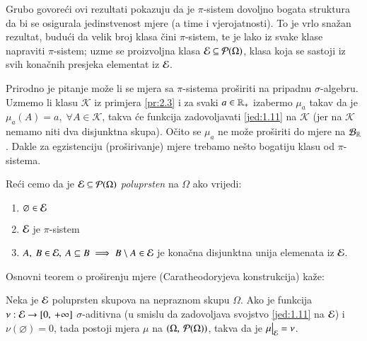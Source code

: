 \begin{nap} \label{nap:2.10}
    Grubo govore\' ci ovi rezultati pokazuju da je $\pi$-sistem
    dovoljno bogata struktura da bi se osigurala jedinstvenost mjere
    (a time i vjerojatnosti). To je vrlo sna\v zan rezultat,
    budu\' ci da velik broj klasa \v cini $\pi$-sistem, te je lako iz
    svake klase napraviti $\pi$-sistem; uzme se proizvoljna klasa
    $\mathcal{E} \subseteq \mathcal{P}({\Omega})$, klasa koja se sastoji iz svih
    kona\v cnih presjeka elementat iz $\mathcal{E}$.

    Prirodno je pitanje mo\v ze li se mjera sa $\pi$-sistema
    pro\v siriti na pripadnu $\sigma$-algebru. Uzmemo li klasu
    $\mathcal{K}$ iz primjera \ref{pr:2.3} i za svaki $a \in \mathbb{R}_+$
    izabermo $\mu_a$ takav da je $\mu_a(A) = a, \; \forall A \in
    \mathcal{K}$, takva \' ce funkcija zadovoljavati
    \eqref{jed:1.11} na $\mathcal{K}$ (jer na $\mathcal{K}$ nemamo
    niti dva disjunktna skupa). O\v cito se $\mu_a$ ne mo\v ze
    pro\v siriti do mjere na $\mathcal{B}_{\mathbb{R}}$.
    Dakle za egzistenciju  (pro\v sirivanje) mjere trebamo ne\v sto
    bogatiju klasu od $\pi$-sistema.
\end{nap}

Re\' ci cemo da je $\mathcal{E} \subseteq \mathcal{P}({\Omega})$ \emph{poluprsten}
na $\Omega$ ako vrijedi:
\begin{enumerate}[label=(\roman*)]
    \item $\varnothing \in \mathcal{E}$
    \item $\mathcal{E}$ je $\pi$-sistem
    \item $A, \: B \in \mathcal{E}, \: A \subseteq B \implies B \setminus
        A \in \mathcal{E}$ je kona\v cna disjunktna unija elemenata iz $\mathcal{E}$.
\end{enumerate}

Osnovni teorem o pro\v sirenju mjere (Caratheodoryjeva konstrukcija)
ka\v ze:

\begin{tm}  \label{tm:2.11}
    Neka je $\mathcal{E}$ poluprsten skupova na nepraznom skupu $\Omega$. Ako
    je funkcija $\nu: \mathcal{E} \to [0, \: + \infty]$ $\sigma$-aditivna
    (u smislu da zadovoljava svojstvo \eqref{jed:1.11} na $\mathcal{E}$)
    i $\nu(\varnothing) = 0$, tada postoji mjera $\mu$ na $(\Omega,
    \: \mathcal{P}({\Omega}))$, takva da je $\restr{\mu}{\E} = \nu$.
\end{tm}

